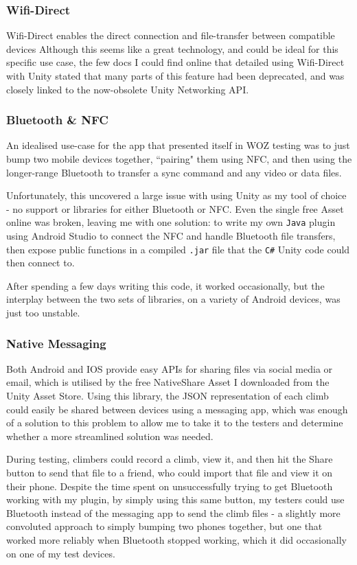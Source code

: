 \subsubsection{Wifi-Direct}
Wifi-Direct enables the direct connection and file-transfer between compatible devices
Although this seems like a great technology, and could be ideal for this specific use case, the few docs I could find online that detailed using Wifi-Direct with Unity stated that many parts of this feature had been deprecated, and was closely linked to the now-obsolete Unity Networking API.


\subsubsection{Bluetooth \& NFC}
An idealised use-case for the app that presented itself in WOZ testing was to just bump two mobile devices together, ``pairing" them using NFC, and then using the longer-range Bluetooth to transfer a sync command and any video or data files.

Unfortunately, this uncovered a large issue with using Unity as my tool of choice - no support or libraries for either Bluetooth or NFC. 
Even the single free Asset online was broken, leaving me with one solution: to write my own \verb|Java| plugin using Android Studio to connect the NFC and handle Bluetooth file transfers, then expose public functions in a compiled \verb|.jar| file that the \verb|C#| Unity code could then connect to.

After spending a few days writing this code, it worked occasionally, but the interplay between the two sets of libraries, on a variety of Android devices, was just too unstable.

\subsubsection{Native Messaging}
Both Android and IOS provide easy APIs for sharing files via social media or email, which is utilised by the free NativeShare Asset I downloaded from the Unity Asset Store.
Using this library, the JSON representation of each climb could easily be shared between devices using a messaging app, which was enough of a solution to this problem to allow me to take it to the testers and determine whether a more streamlined solution was needed.

During testing, climbers could record a climb, view it, and then hit the Share button to send that file to a friend, who could import that file and view it on their phone.
Despite the time spent on unsuccessfully trying to get Bluetooth working with my plugin, by simply using this same button, my testers could use Bluetooth instead of the messaging app to send the climb files - a slightly more convoluted approach to simply bumping two phones together, but one that worked more reliably when Bluetooth stopped working, which it did occasionally on one of my test devices.


